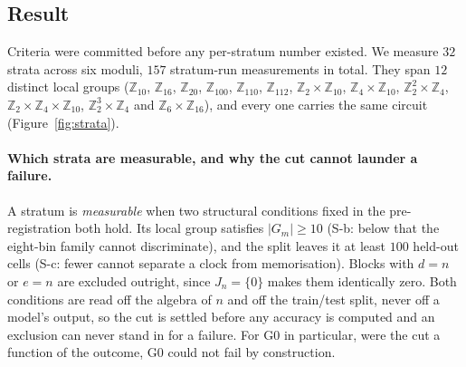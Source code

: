 \subsection{Result}
\label{sec:strata-result}

Criteria were committed before any per-stratum number existed. We measure $32$ strata across
six moduli, $157$ stratum-run measurements in total. They span $12$ distinct local groups
($\mathbb{Z}_{10}$, $\mathbb{Z}_{16}$, $\mathbb{Z}_{20}$, $\mathbb{Z}_{100}$,
$\mathbb{Z}_{110}$, $\mathbb{Z}_{112}$, $\mathbb{Z}_{2} \times \mathbb{Z}_{10}$,
$\mathbb{Z}_{4} \times \mathbb{Z}_{10}$, $\mathbb{Z}_{2}^{2} \times \mathbb{Z}_{4}$,
$\mathbb{Z}_{2} \times \mathbb{Z}_{4} \times \mathbb{Z}_{10}$,
$\mathbb{Z}_{2}^{3} \times \mathbb{Z}_{4}$ and $\mathbb{Z}_{6} \times \mathbb{Z}_{16}$),
and every one carries the same circuit (Figure~\ref{fig:strata}).

\paragraph{Which strata are measurable, and why the cut cannot launder a failure.} A stratum
is \emph{measurable} when two structural conditions fixed in the pre-registration both hold.
Its local group satisfies $|G_{m}| \ge 10$ (S-b: below that the eight-bin family cannot
discriminate), and the split leaves it at least $100$ held-out cells (S-c: fewer cannot
separate a clock from memorisation). Blocks with $d = n$ or $e = n$ are excluded outright,
since $J_{n} = \{0\}$ makes them identically zero. Both conditions are read off the
algebra of $n$ and off the train/test split, never off a model's output, so the cut is
settled before any accuracy is computed and an exclusion can never stand in for a failure.
For G0 in particular, were the cut a function of the outcome, G0 could not fail by
construction.

